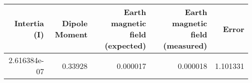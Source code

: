 \begin{table}[H]
\centering
\label{end_result}
\begin{tabular}{rrrrr}
\toprule
 Intertia (I) &  Dipole Moment &  Earth magnetic field (expected) &  Earth magnetic field (measured) &    Error \\
\midrule
 2.616384e-07 &        0.33928 &                         0.000017 &                         0.000018 & 1.101331 \\
\bottomrule
\end{tabular}
\end{table}
